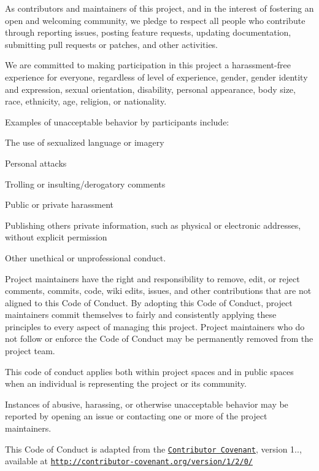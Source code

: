 As contributors and maintainers of this project, and in the interest of fostering an open and welcoming community, we pledge to respect all people who contribute through reporting issues, posting feature requests, updating documentation, submitting pull requests or patches, and other activities.

We are committed to making participation in this project a harassment-\/free experience for everyone, regardless of level of experience, gender, gender identity and expression, sexual orientation, disability, personal appearance, body size, race, ethnicity, age, religion, or nationality.

Examples of unacceptable behavior by participants include\+:


\begin{DoxyItemize}
\item The use of sexualized language or imagery
\item Personal attacks
\item Trolling or insulting/derogatory comments
\item Public or private harassment
\item Publishing other\textquotesingle{}s private information, such as physical or electronic addresses, without explicit permission
\item Other unethical or unprofessional conduct.
\end{DoxyItemize}

Project maintainers have the right and responsibility to remove, edit, or reject comments, commits, code, wiki edits, issues, and other contributions that are not aligned to this Code of Conduct. By adopting this Code of Conduct, project maintainers commit themselves to fairly and consistently applying these principles to every aspect of managing this project. Project maintainers who do not follow or enforce the Code of Conduct may be permanently removed from the project team.

This code of conduct applies both within project spaces and in public spaces when an individual is representing the project or its community.

Instances of abusive, harassing, or otherwise unacceptable behavior may be reported by opening an issue or contacting one or more of the project maintainers.

This Code of Conduct is adapted from the \href{http://contributor-covenant.org}{\tt Contributor Covenant}, version 1.., available at \href{http://contributor-covenant.org/version/1/2/0/}{\tt http\+://contributor-\/covenant.\+org/version/1/2/0/} 